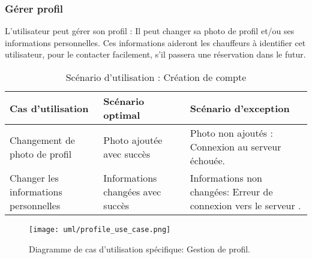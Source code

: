 \subsubsection{Gérer profil}
L'utilisateur peut gérer son profil : Il peut changer sa photo de profil et/ou ses informations personnelles. Ces informations aideront les chauffeurs à identifier cet utilisateur, pour le contacter facilement, s'il passera une réservation dans le futur.
\begin{table}[H]
    \begin{center}
        \begin{tabularx}{\textwidth} {
                | >{\centering\arraybackslash}X
                | >{\centering\arraybackslash}X
                | >{\centering\arraybackslash}X |}
            \hline
            Cas d'utilisation                     & Scénario optimal                  & Scénario d'exception                                             \\
            \hline
            Changement de photo de profil         & Photo ajoutée avec succès         & Photo non ajoutés : Connexion au serveur échouée.                \\
            \hline
            Changer les informations personnelles & Informations changées avec succès & Informations non changées: Erreur de connexion vers le serveur . \\
            \hline
        \end{tabularx}
        \captionsetup{justification=centering}
        \caption{Scénario d'utilisation : Création de compte}
        \label{tab:profile_update_scenario}
    \end{center}
\end{table}
\begin{figure}[H]
    \centering
    \texttt{[image: uml/profile\_use\_case.png]}
    \vspace{1cm}
    \captionsetup{justification=centering}
    \caption{Diagramme de cas d'utilisation spécifique: Gestion de profil.}
    \label{fig:use_case_manage_profile}
\end{figure}
